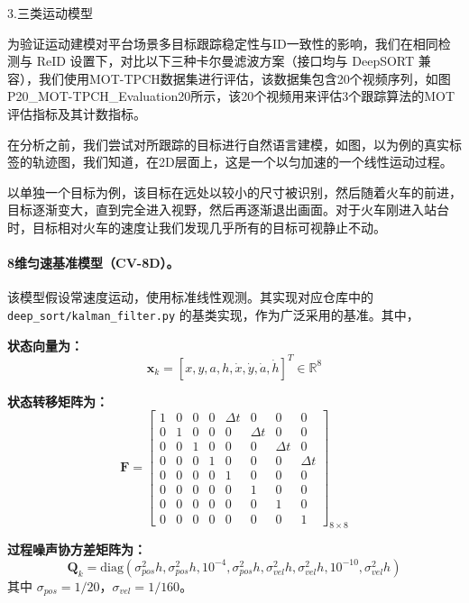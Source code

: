3.三类运动模型

为验证运动建模对平台场景多目标跟踪稳定性与ID一致性的影响，我们在相同检测与 ReID 设置下，对比以下三种卡尔曼滤波方案（接口均与 DeepSORT 兼容），我们使用MOT-TPCH数据集进行评估，该数据集包含20个视频序列，如图P20_MOT-TPCH_Evaluation20所示，该20个视频用来评估3个跟踪算法的MOT评估指标及其计数指标。

在分析之前，我们尝试对所跟踪的目标进行自然语言建模，如图，以为例的真实标签的轨迹图，我们知道，在2D层面上，这是一个以匀加速的一个线性运动过程。

以单独一个目标为例，该目标在远处以较小的尺寸被识别，然后随着火车的前进，目标逐渐变大，直到完全进入视野，然后再逐渐退出画面。对于火车刚进入站台时，目标相对火车的速度让我们发现几乎所有的目标可视静止不动。
\paragraph{8维匀速基准模型（CV-8D）。} 该模型假设常速度运动，使用标准线性观测。其实现对应仓库中的 \texttt{deep\_sort/kalman\_filter.py} 的基类实现，作为广泛采用的基准。其中，

\textbf{状态向量为：}
\begin{equation}
\mathbf{x}_k = [x, y, a, h, \dot{x}, \dot{y}, \dot{a}, \dot{h}]^T \in \mathbb{R}^{8}
\end{equation}

\textbf{状态转移矩阵为：}
\begin{equation}
\mathbf{F} = \begin{bmatrix}
1 & 0 & 0 & 0 & \Delta t & 0 & 0 & 0 \\
0 & 1 & 0 & 0 & 0 & \Delta t & 0 & 0 \\
0 & 0 & 1 & 0 & 0 & 0 & \Delta t & 0 \\
0 & 0 & 0 & 1 & 0 & 0 & 0 & \Delta t \\
0 & 0 & 0 & 0 & 1 & 0 & 0 & 0 \\
0 & 0 & 0 & 0 & 0 & 1 & 0 & 0 \\
0 & 0 & 0 & 0 & 0 & 0 & 1 & 0 \\
0 & 0 & 0 & 0 & 0 & 0 & 0 & 1
\end{bmatrix}_{8 \times 8}
\end{equation}

\textbf{过程噪声协方差矩阵为：}
\begin{equation}
\mathbf{Q}_k = \text{diag}(\sigma_{pos}^2 h, \sigma_{pos}^2 h, 10^{-4}, \sigma_{pos}^2 h, \sigma_{vel}^2 h, \sigma_{vel}^2 h, 10^{-10}, \sigma_{vel}^2 h)
\end{equation}
其中 $\sigma_{pos} = 1/20$，$\sigma_{vel} = 1/160$。

